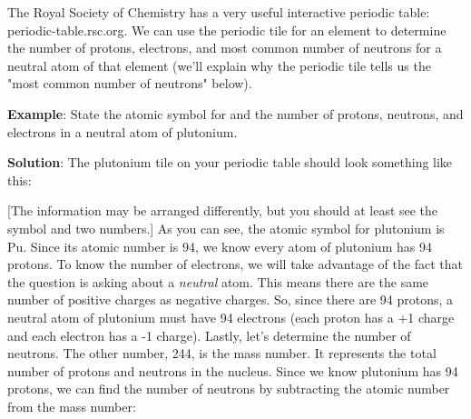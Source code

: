 The Royal Society of Chemistry has a very useful interactive periodic table: 
periodic-table.rsc.org. We can use the periodic tile for an element to 
determine the number of protons, electrons, and most common number of neutrons 
for a neutral atom of that element (we'll explain why the periodic tile tells 
us the "most common number of neutrons" below). 

\textbf{Example}: State the atomic symbol for and the number of protons, 
neutrons, and electrons in a neutral atom of plutonium. 

\textbf{Solution}: The plutonium tile on your periodic table should look 
something like this:
\begin{center}
\end{center}

[The information may be arranged differently, but you should at least see the 
symbol and two numbers.] As you can see, the atomic symbol for plutonium is Pu.
Since its atomic number is 94, we know every atom of plutonium has 94 protons. 
To know the number of electrons, we will take advantage of the fact that the 
question is asking about a \textit{neutral} atom. This means there are the same
number of positive charges as negative charges. So, since there are 94 protons,
a neutral atom of plutonium must have 94 electrons (each proton has a +1 charge
and each electron has a -1 charge). Lastly, let's determine the number of 
neutrons. The other number, 244, is the mass number. It represents the total 
number of protons and neutrons in the nucleus. Since we know plutonium has 94 
protons, we can find the number of neutrons by subtracting the atomic number 
from the mass number:

\begin{center}
\end{center}

